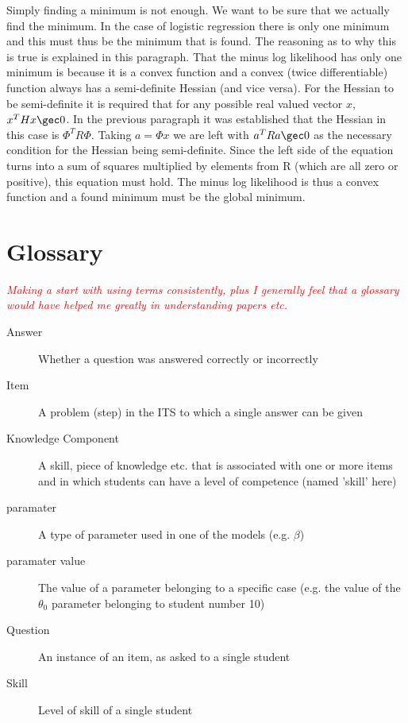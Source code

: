 \documentclass{scrartcl}
\newcommand\todo[1]{\textit{\textcolor{red}{#1}}}
\begin{document}
Simply finding a minimum is not enough. We want to be sure that we actually find the minimum. In the case of logistic regression there is only one minimum and this must thus be the minimum that is found. The reasoning as to why this is true is explained in this paragraph. That the minus log likelihood has only one minimum is because it is a convex function and a convex (twice differentiable) function always has a semi-definite Hessian (and vice versa). For the Hessian to be semi-definite it is required that for any possible real valued vector $x$, $x^{T}Hx\gec 0$. In the previous paragraph it was established that the Hessian in this case is $\Phi^{T} R \Phi$. Taking $a=\Phi x$ we are left with $a^{T}Ra\gec 0$ as the necessary condition for the Hessian being semi-definite. Since the left side of the equation turns into a sum of squares multiplied by elements from R (which are all zero or positive), this equation must hold. The minus log likelihood is thus a convex function and a found minimum must be the global minimum.


\pagebreak 
\section{Glossary}
\todo{
Making a start with using terms consistently, plus I generally feel that a glossary would have helped me greatly in understanding papers etc.}
\begin{description}
\item[Answer]Whether a question was answered correctly or incorrectly
  \item[Item] A problem (step) in the ITS to which a single answer can be given
  \item[Knowledge Component] A skill, piece of knowledge etc. that is associated with one or more items and in which students can have a level of competence (named 'skill' here)
  \item[paramater] A type of parameter used in one of the models (e.g. $\beta$)
  \item[paramater value] The value of a parameter belonging to a specific case (e.g. the value of the $\theta_{0}$ parameter belonging to student number 10)
  \item[Question] An instance of an item, as asked to a single student
  \item[Skill] Level of skill of a single student
\end{description}
\end{document}
